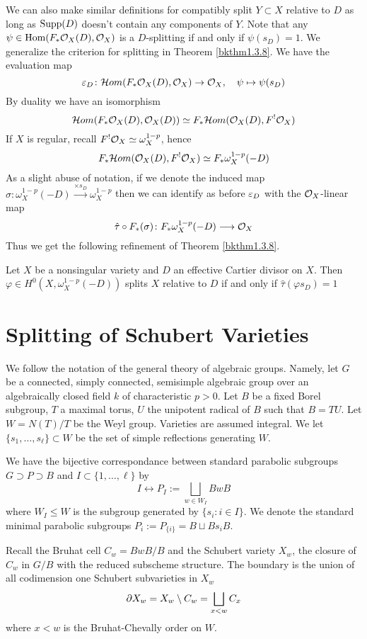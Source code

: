 \documentclass[12pt]{article}
\begin{document}
We can also make similar definitions for compatibly split $Y \subset X$ relative to $D$ as long as $\operatorname{Supp}(D)$ doesn't contain any components of $Y$. Note that any $\psi \in \operatorname{Hom}(F_* \mathcal{O}_X(D), \mathcal{O}_X)$ is a $D$-splitting if and only if $\psi(s_D) = 1$. We generalize the criterion for splitting in Theorem \ref{bkthm1.3.8}. We have the evaluation map
\[\varepsilon_D \colon \mathcal{H} om(F_* \mathcal{O}_X(D), \mathcal{O}_X) \to \mathcal{O}_X, \quad \psi \mapsto \psi(s_D)\]
By duality we have an isomorphism
\[\mathcal{H} om(F_* \mathcal{O}_X(D), \mathcal{O}_X(D)) \simeq F_*\mathcal{H} om(\mathcal{O}_X(D), F^! \mathcal{O}_X)\]
If $X$ is regular, recall $F^! \mathcal{O}_X \simeq \omega_X^{1-p}$, hence
\[F_*\mathcal{H} om(\mathcal{O}_X(D), F^! \mathcal{O}_X) \simeq F_* \omega_X^{1-p}(-D)\]
As a slight abuse of notation, if we denote the induced map $\sigma \colon \omega_X^{1-p}(-D) \xrightarrow{\times s_D} \omega_X^{1-p}$ then we can identify as before $\varepsilon_D$ with the $\mathcal{O}_X$-linear map
\[\hat{\tau} \circ F_*(\sigma) \colon F_* \omega_X^{1-p}(-D) \longrightarrow \mathcal{O}_X\]
Thus we get the following refinement of Theorem \ref{bkthm1.3.8}.
\begin{thm}\label{bkthm1.4.10}
    Let $X$ be a nonsingular variety and $D$ an effective Cartier divisor on $X$. Then $\varphi \in H^0(X, \omega_X^{1-p}(-D))$ splits $X$ relative to $D$ if and only if $\hat{\tau}(\varphi s_D) = 1$
\end{thm}
\section{Splitting of Schubert Varieties}
We follow the notation of the general theory of algebraic groups. Namely, let $G$ be a connected, simply connected, semisimple algebraic group over an algebraically closed field $k$ of characteristic $p > 0$. Let $B$ be a fixed Borel subgroup, $T$ a maximal torus, $U$ the unipotent radical of $B$ such that $B = TU$. Let $W = N(T)/T$ be the Weyl group. Varieties are assumed integral. We let $\{s_1,\ldots,s_{\ell}\} \subset W$ be the set of simple reflections generating $W$.

We have the bijective correspondance between standard parabolic subgroups $G \supset P \supset B$ and $I \subset \{1,\ldots,\ell\}$ by
\[I \longleftrightarrow P_I := \bigsqcup_{w \in W_I} BwB\]
where $W_I \leq W$ is the subgroup generated by $\{s_{i} \colon i \in I\}$. We denote the standard minimal parabolic subgroups $P_i := P_{\{i\}} = B \sqcup Bs_iB$.

Recall the Bruhat cell $C_w = BwB/B$ and the Schubert variety $X_w$, the closure of $C_w$ in $G/B$ with the reduced subscheme structure. The boundary is the union of all codimension one Schubert subvarieties in $X_w$
\[\partial X_w = X_w \setminus C_w = \bigsqcup_{x < w} C_x\]
where $x < w$ is the Bruhat-Chevally order on $W$.
\end{document}
